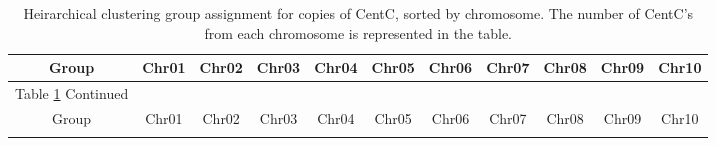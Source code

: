 \pagebreak
 \begin{longtable}[c]{|c|c|c|c|c|c|c|c|c|c|c|}
 \caption{Heirarchical clustering group assignment for copies of CentC, sorted by chromosome.  The number of CentC's from each chromosome is represented in the table.\label{long}}\\ 
\hline

\hline
Group & Chr01 & Chr02 & Chr03 & Chr04 & Chr05 & Chr06 & Chr07 & Chr08 & Chr09 & Chr10\\
 \hline
 \endfirsthead

\hline
\multicolumn{1}{|c|}{Table \ref{long} Continued}\\
\hline
Group & Chr01 & Chr02 & Chr03 & Chr04 & Chr05 & Chr06 & Chr07 & Chr08 & Chr09 & Chr10\\ 
\hline
 \endhead %

 \hline
 \endhead
 
 \hline
 \endfoot
 
 \hline
 \endlastfoot
 

\end{longtable}
